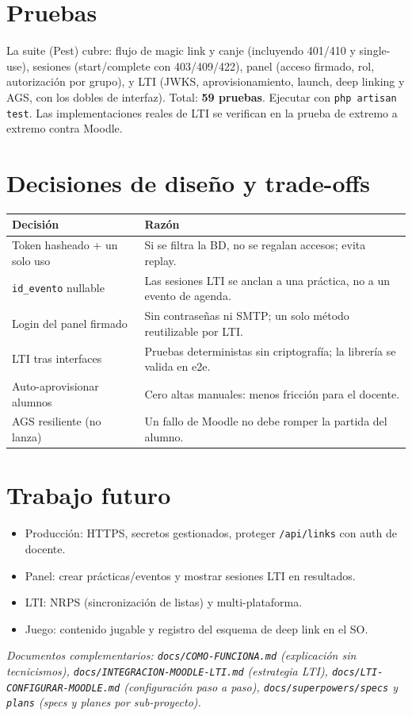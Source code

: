 \documentclass[11pt,letterpaper]{article}
\begin{document}
\section{Pruebas}
La suite (Pest) cubre: flujo de magic link y canje (incluyendo 401/410 y
single-use), sesiones (start/complete con 403/409/422), panel (acceso firmado,
rol, autorización por grupo), y LTI (JWKS, aprovisionamiento, launch, deep
linking y AGS, con los dobles de interfaz). Total: \textbf{59 pruebas}. Ejecutar
con \texttt{php artisan test}. Las implementaciones reales de LTI se verifican en
la prueba de extremo a extremo contra Moodle.

\section{Decisiones de diseño y trade-offs}
\begin{longtable}{p{5cm} p{9.6cm}}
\toprule \textbf{Decisión} & \textbf{Razón} \\ \midrule
\endhead
Token hasheado + un solo uso & Si se filtra la BD, no se regalan accesos; evita replay. \\
\texttt{id\_evento} nullable & Las sesiones LTI se anclan a una práctica, no a un evento de agenda. \\
Login del panel firmado & Sin contraseñas ni SMTP; un solo método reutilizable por LTI. \\
LTI tras interfaces & Pruebas deterministas sin criptografía; la librería se valida en e2e. \\
Auto-aprovisionar alumnos & Cero altas manuales: menos fricción para el docente. \\
AGS resiliente (no lanza) & Un fallo de Moodle no debe romper la partida del alumno. \\
\bottomrule
\end{longtable}

\section{Trabajo futuro}
\begin{itemize}[leftmargin=1.3em,nosep]
  \item Producción: HTTPS, secretos gestionados, proteger \texttt{/api/links} con auth de docente.
  \item Panel: crear prácticas/eventos y mostrar sesiones LTI en resultados.
  \item LTI: NRPS (sincronización de listas) y multi-plataforma.
  \item Juego: contenido jugable y registro del esquema de deep link en el SO.
\end{itemize}

\vfill
\begin{center}\small\itshape
Documentos complementarios: \texttt{docs/COMO-FUNCIONA.md} (explicación sin
tecnicismos), \texttt{docs/INTEGRACION-MOODLE-LTI.md} (estrategia LTI),
\texttt{docs/LTI-CONFIGURAR-MOODLE.md} (configuración paso a paso),
\texttt{docs/superpowers/specs} y \texttt{plans} (specs y planes por sub-proyecto).
\end{center}
\end{document}
